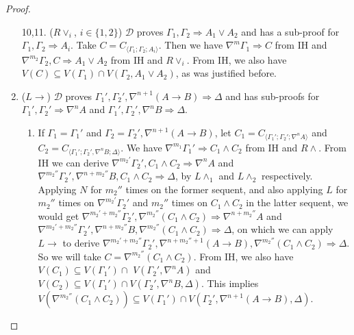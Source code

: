 \begin{proof}
\begin{enumerate}
		\item[10,11.] ($R\lor_i$, {\small$i \in \{1,2\}$}) $\mathcal{D}$ proves $\Gamma_1 , \Gamma_2 \Rightarrow A_1 \lor A_2$ and has a sub-proof for $\Gamma_1 , \Gamma_2 \Rightarrow A_i$. Take $C = C_{\langle\Gamma_1;\Gamma_2;A_i\rangle}$. Then we have $\nabla^m \Gamma_1 \Rightarrow C$ from IH and $\nabla^{m_2} \Gamma_2 , C \Rightarrow A_1 \lor A_2$ from IH and $R\lor_i$.
		From IH, we also have $V(C) \subseteq V(\Gamma_1) \cap V(\Gamma_2 , A_1 \lor A_2)$, as was justified before.
		\setcounter{enumi}{11}

		\item ($L\rightarrow$) $\mathcal{D}$ proves $\Gamma_1' , \Gamma_2' , \nabla^{n+1} (A \rightarrow B) \Rightarrow \Delta$ and has sub-proofs for $\Gamma_1' , \Gamma_2' \Rightarrow \nabla^n A$ and $\Gamma_1' , \Gamma_2' , \nabla^n B \Rightarrow \Delta$.
		\begin{enumerate}
			\item If $\Gamma_1 = \Gamma_1'$ and $\Gamma_2 = \Gamma_2' , \nabla^{n+1} (A \rightarrow B)$, let $C_1 = C_{\langle\Gamma_1';\Gamma_2';\nabla^n A\rangle}$ and $C_2 = C_{\langle\Gamma_1';\Gamma_2',\nabla^n B;\Delta\rangle}$.
			We have $\nabla^{m_1} \Gamma_1' \Rightarrow C_1 \land C_2$ from IH and $R\land$.
			From IH we can derive $\nabla^{m_2'} \Gamma_2' , C_1 \land C_2 \Rightarrow \nabla^n A$ and $\nabla^{m_2''} \Gamma_2' , \nabla^{n+m_2''} B , C_1 \land C_2 \Rightarrow \Delta$, by $L\land_1$ and $L\land_2$ respectively. Applying $N$ for $m_2''$ times on the former sequent, and also applying $L$ for $m_2''$ times on $\nabla^{m_2'} \Gamma_2'$ and $m_2''$ times on $C_1 \wedge C_2$ in the latter sequent, we would get $\nabla^{m_2'+m_2''} \Gamma_2' , \nabla^{m_2''} (C_1 \land C_2) \Rightarrow \nabla^{n+m_2''} A$ and $\nabla^{m_2'+m_2''} \Gamma_2' , \nabla^{n+m_2''} B , \nabla^{m_2''} (C_1 \land C_2) \Rightarrow \Delta$, on which we can apply $L\rightarrow$ to derive $\nabla^{m_2'+m_2''} \Gamma_2' , \nabla^{n+m_2''+1} (A \rightarrow B) , \nabla^{m_2''} (C_1 \land C_2) \Rightarrow \Delta$. So we will take $C = \nabla^{m_2''}(C_1 \wedge C_2)$.
			From IH, we also have $V(C_1) \subseteq V(\Gamma_1') \cap$ $V(\Gamma_2' , \nabla^n A)$ and $V(C_2) \subseteq V(\Gamma_1') \cap V(\Gamma_2' , \nabla^n B , \Delta)$. This implies $V(\nabla^{m_2''}(C_1 \land C_2)) \subseteq V(\Gamma_1') \cap V(\Gamma_2' , \nabla^{n+1} (A \rightarrow B) , \Delta)$.


\end{enumerate}
\end{enumerate}
\end{proof}
